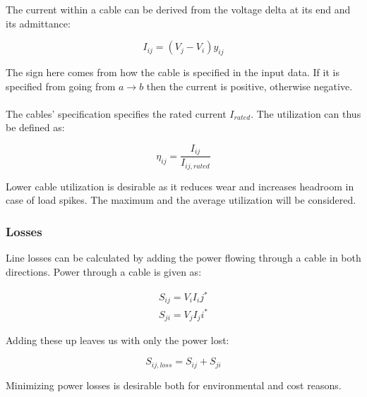The current within a cable can be derived from the voltage delta at its
end and its admittance:

\begin{equation}
  I_{ij} = (V_j - V_i)y_{ij}
\end{equation}

The sign here comes from how the cable is specified in the input data. If it is
specified from going from $a \to b$ then the current is positive, otherwise negative.\\
\\
The cables' specification specifies the rated current $I_{rated}$. The utilization
can thus be defined as:

\begin{equation}
  \eta_{ij} = \frac{I_{ij}}{I_{ij, rated}}
  \label{eq:measures:cable_utilization}
\end{equation}

Lower cable utilization is desirable as it reduces wear and increases
headroom in case of load spikes. The maximum and the average utilization
will be considered.

\subsubsection{Losses}

Line losses can be calculated by adding the power flowing through
a cable in both directions. Power through a cable is given as:

\begin{equation}
  \begin{split}
  S_{ij} = V_i I_ij^*\\
  S_{ji} = V_j I_ji^*
  \end{split}
\end{equation}

Adding these up leaves us with only the power lost:

\begin{equation}
S_{ij, loss} = S_{ij} + S_{ji}
\end{equation}

Minimizing power losses is desirable both for environmental and cost reasons.